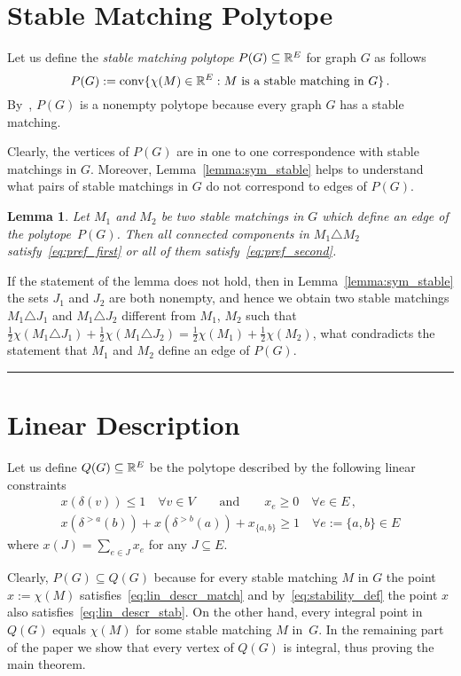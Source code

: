 \documentclass[preprint]{elsarticle}
\newtheorem{lemma}[fact]{Lemma}
\newenvironment{proof}{{\bf Proof:  }}{\hfill\rule{2mm}{2mm}}
\DeclareMathOperator{\convOp}{conv}
\newcommand{\conv}{\convOp}
\begin{document}
\section{Stable Matching Polytope}

Let us define the \emph{stable matching polytope} $P(G)\subseteq\mathbb{R}^E$ for graph $G$ as follows
$$
	P(G):=\conv\{\chi(M)\in\R^E: M \text{ is a stable matching in } G\}\,.
$$
By~\cite{}, $P(G)$ is a nonempty polytope because every graph $G$ has a stable matching.

Clearly, the vertices of $P(G)$ are in one to one correspondence with stable matchings in $G$. Moreover, Lemma~\ref{lemma:sym_stable} helps to understand what pairs of stable matchings in $G$ do not correspond to edges of $P(G)$.

\begin{lemma}
Let $M_1$ and $M_2$ be two stable matchings in $G$ which define an edge of the polytope~$P(G)$. Then all connected components in $M_1\triangle M_2$ satisfy~\eqref{eq:pref_first} or all of them satisfy~\eqref{eq:pref_second}.  
\end{lemma}
\begin{proof}
If the statement of the lemma does not hold, then in Lemma~\ref{lemma:sym_stable} the sets $J_1$ and $J_2$ are both nonempty, and hence we obtain two stable matchings $M_1\triangle J_1$ and $M_1\triangle J_2$ different from $M_1$, $M_2$ such that $\frac{1}{2}\chi(M_1\triangle J_1)+\frac{1}{2}\chi(M_1\triangle J_2)=\frac{1}{2}\chi(M_1)+\frac{1}{2}\chi(M_2)$, what condradicts the statement that $M_1$ and $M_2$ define an edge of $P(G)$.
\end{proof}


\section{Linear Description}
Let us define $Q(G)\subseteq\mathbb{R}^E$ be the polytope described  by the following linear constraints
\begin{align}
x(\delta(v)) \leq 1\quad \forall v \in V\qquad \text{and} \qquad x_e \geq 0\quad \forall e \in E\,,\label{eq:lin_descr_match}\\
x(\delta^{>a}(b))+ x(\delta^{>b}(a)) + x_{\{a,b\}} \geq 1 \quad \forall e:=\{a,b\} \in E \label{eq:lin_descr_stab}
\end{align}
where $x(J) = \sum_{e \in J} x_e$ for any $J \subseteq E$.

Clearly, $P(G)\subseteq Q(G)$ because for every stable matching $M$ in $G$ the point $x:=\chi(M)$  satisfies~\eqref{eq:lin_descr_match} and by~\eqref{eq:stability_def} the point $x$ also satisfies~\eqref{eq:lin_descr_stab}. On the other hand, every integral point in $Q(G)$ equals $\chi(M)$ for some stable matching $M$ in~$G$. In the remaining part of the paper we show that every vertex of $Q(G)$ is integral, thus proving the main theorem.
\end{document}
